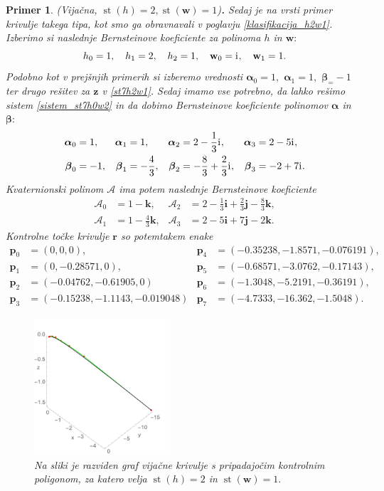 \documentclass[12pt,a4paper,twoside]{article}
\newcommand{\iu}{\mathrm{i}\mkern1mu} %
\theoremstyle{definition} %
\theoremstyle{plain} %
\theoremstyle{primerstyle}
\newtheorem{primer}[definicija]{Primer}
\numberwithin{equation}{section}  %
\newcommand{\pV}{\mathbf{p}}
\newcommand{\rV}{\mathbf{r}}
\newcommand{\iV}{\mathbf{i}}
\newcommand{\jV}{\mathbf{j}}
\newcommand{\kV}{\mathbf{k}}
\newcommand{\wV}{\mathbf{w}}
\newcommand{\zV}{\mathbf{z}}
\newcommand{\AQ}{\mathcal{A}}
\newcommand{\balpha}{\boldsymbol \alpha}
\newcommand{\bbeta}{\boldsymbol \beta}
\DeclareMathOperator{\st}{st}
\begin{document}
\begin{primer}
	\label{primer_h2w1_vijacna}
	\textnormal{ }(Vijačna, $\st(h)=2,\st(\wV)=1$)\textbf{.}
	Sedaj je na vrsti primer krivulje takega tipa, kot smo ga obravnavali v poglavju \ref{klasifikacija_h2w1}. Izberimo si naslednje Bernsteinove koeficiente za polinoma $h$ in $\wV:$
	$$h_0=1,\quad h_1=2,\quad h_2=1,\quad\wV_0=\iu,\quad\wV_1=1.$$
	Podobno kot v prejšnjih primerih si izberemo vrednosti $\balpha_0=1,$ $\balpha_1=1,$ $\bbeta_=-1$ ter drugo rešitev za $\zV$ v \eqref{st7h2w1}. Sedaj imamo vse potrebno, da lahko rešimo sistem \eqref{sistem_st7h0w2} in da dobimo Bernsteinove koeficiente polinomov $\balpha$ in $\bbeta:$
	\begin{align*}
		\balpha_0&=1,&\balpha_1&=1,&\balpha_2&=2-\frac{1}{3}\iu,&\balpha_3&=2-5\iu,\\
		\bbeta_0&=-1,&\bbeta_1&=-\frac{4}{3},&\bbeta_2&=-\frac{8}{3}+\frac{2}{3}\iu,&\bbeta_3&=-2+7\iu.
	\end{align*}
	Kvaternionski polinom $\AQ$ ima potem naslednje Bernsteinove koeficiente
	\begin{align*}
		\AQ_0&=1-\kV,&\AQ_2&=2-\frac{1}{3}\iV+\frac{2}{3}\jV-\frac{8}{3}\kV,\\
		\AQ_1&=1-\frac{4}{3}\kV,&\AQ_3&=2-5\iV+7\jV-2\kV.
	\end{align*}
	Kontrolne točke krivulje $\rV$ so potemtakem enake
	\begin{align*}
		\pV_0&=(0,0,0),&\pV_4&=(-0.35238, -1.8571, -0.076191),\\
		\pV_1&=(0, -0.28571, 0),&\pV_5&=(-0.68571, -3.0762, -0.17143),\\
		\pV_2&=(-0.04762, -0.61905, 0)&\pV_6&=(-1.3048, -5.2191, -0.36191),\\
		\pV_3&=(-0.15238, -1.1143, -0.019048)&\pV_7&=(-4.7333, -16.362, -1.5048).
	\end{align*}
	\begin{figure}[h]
	  \centering
	  \includegraphics[width=0.45\textwidth]{images/h2w1_vijacna.pdf}
	  \caption[Primer vijačne krivulje ($\st(h)=2,$ $\st(\wV)=1$)]{Na sliki je razviden graf vijačne krivulje s pripadajočim kontrolnim poligonom, za katero velja $\st(h)=2$ in $\st(\wV)=1.$}
	  \label{fig:h2w1_vijacna}
	\end{figure}


\end{primer}
\end{document}
